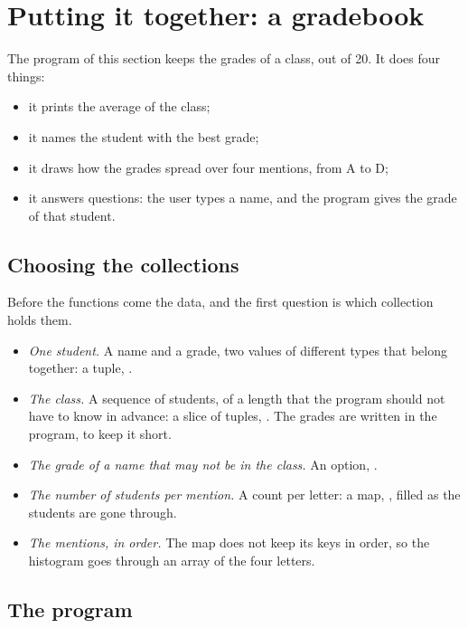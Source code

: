 \vfill\pagebreak
\section{Putting it together: a gradebook}
\label{sec:collections:gradebook}

The program of this section keeps the grades of a class, out of 20. It does four
things:

\begin{itemize}
\item[a)] it prints the average of the class;
\item[b)] it names the student with the best grade;
\item[c)] it draws how the grades spread over four mentions, from A to D;
\item[d)] it answers questions: the user types a name, and the program gives
  the grade of that student.
\end{itemize}

\subsection{Choosing the collections}

Before the functions come the data, and the first question is which collection
holds them.

\begin{itemize}
\item \textit{One student.} A name and a grade, two values of different types
  that belong together: a tuple, .
\item \textit{The class.} A sequence of students, of a length that the program
  should not have to know in advance: a slice of tuples,
  \token{[([c8], i32)]}. The grades are written in the program, to keep it
  short.
\item \textit{The grade of a name that may not be in the class.} An option,
  .
\item \textit{The number of students per mention.} A count per letter: a map,
  \token{[c8 => i32]}, filled as the students are gone through.
\item \textit{The mentions, in order.} The map does not keep its keys in order,
  so the histogram goes through an array of the four letters.
\end{itemize}

\subsection{The program}

